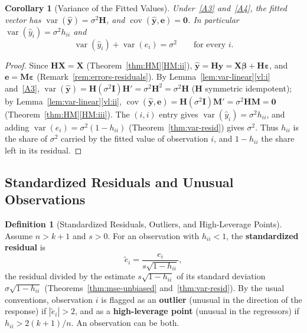 \documentclass[14pt]{extarticle}
\theoremstyle{plain}
\newtheorem{corollary}[theorem]{Corollary}
\theoremstyle{definition}
\newtheorem{definition}[theorem]{Definition}
\theoremstyle{remark}
\DeclareMathOperator\var{var}
\DeclareMathOperator\cov{cov}
\newcommand{\bX}{\mathbf{X}}
\newcommand{\by}{\mathbf{y}}
\def\bb{\boldsymbol{\beta}}
\newcommand{\be}{\boldsymbol{\varepsilon}}
\newcommand{\bI}{\mathbf{I}}
\newcommand{\bH}{\mathbf{H}}
\newcommand{\bM}{\mathbf{M}}
\newcommand{\bzero}{\mathbf{0}}
\begin{document}
\begin{corollary}[Variance of the Fitted Values]\label{cor:var-fitted}
Under~\ref{A3} and~\ref{A4}, the fitted vector has $\var(\hat{\by}) = \sigma^2\bH$, and $\cov(\hat{\by}, \mathbf{e}) = \bzero$. In particular $\var(\hat{y}_i) = \sigma^2h_{ii}$ and
\[
\var(\hat{y}_i) + \var(e_i) = \sigma^2 \qquad \text{for every } i.
\]
\end{corollary}

\begin{proof}
Since $\bH\bX = \bX$ (Theorem~\ref{thm:HM}\ref{HM:ii}), $\hat{\by} = \bH\by = \bX\bb + \bH\be$, and $\mathbf{e} = \bM\be$ (Remark~\ref{rem:errors-residuals}). By Lemma~\ref{lem:var-linear}\ref{vl:i} and~\ref{A3}, $\var(\hat{\by}) = \bH(\sigma^2\bI)\bH' = \sigma^2\bH^2 = \sigma^2\bH$ ($\bH$ symmetric idempotent); by Lemma~\ref{lem:var-linear}\ref{vl:ii}, $\cov(\hat{\by}, \mathbf{e}) = \bH(\sigma^2\bI)\bM' = \sigma^2\bH\bM = \bzero$ (Theorem~\ref{thm:HM}\ref{HM:iii}). The $(i,i)$ entry gives $\var(\hat{y}_i) = \sigma^2h_{ii}$, and adding $\var(e_i) = \sigma^2(1 - h_{ii})$ (Theorem~\ref{thm:var-resid}) gives $\sigma^2$. Thus $h_{ii}$ is the share of $\sigma^2$ carried by the fitted value of observation $i$, and $1 - h_{ii}$ the share left in its residual.
\end{proof}

\subsection{Standardized Residuals and Unusual Observations}

\begin{definition}[Standardized Residuals, Outliers, and High-Leverage Points]\label{def:std-resid}
Assume $n > k + 1$ and $s > 0$. For an observation with $h_{ii} < 1$, the \textbf{standardized residual} is
\[
\tilde e_i = \frac{e_i}{s\sqrt{1 - h_{ii}}},
\]
the residual divided by the estimate $s\sqrt{1 - h_{ii}}$ of its standard deviation $\sigma\sqrt{1 - h_{ii}}$ (Theorems~\ref{thm:mse-unbiased} and~\ref{thm:var-resid}). By the usual conventions, observation $i$ is flagged as an \textbf{outlier} (unusual in the direction of the response) if $|\tilde e_i| > 2$, and as a \textbf{high-leverage point} (unusual in the regressors) if $h_{ii} > 2(k+1)/n$. An observation can be both.
\end{definition}
\end{document}
